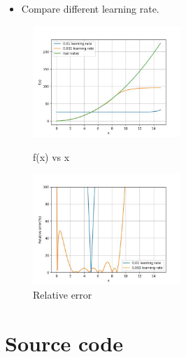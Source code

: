 \documentclass{beamer}
\begin{document}
\begin{frame}
    \frametitle{\secname}
    \begin{itemize}
        \item Compare different learning rate.
    \end{itemize}

    \begin{figure}
        \begin{multicols}{2}
            \includegraphics[width=2.2in]{Figs/Value_neuro_compare.jpg}
            \caption{f(x) vs x}
            \columnbreak

            \includegraphics[width=2.2in]{Figs/Error_neuro_compare.jpg}
            \caption{Relative error}
        \end{multicols}
    \end{figure}
\end{frame}



\section{Source code}
\end{document}
